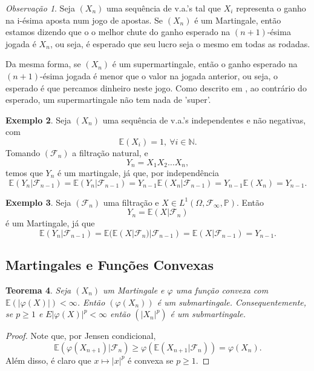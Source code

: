 \documentclass[12pt,a4paper,oneside]{book}
\newtheorem{theorem}{Teorema}[section]
\theoremstyle{definition}
\newtheorem{example}[theorem]{Exemplo}
\theoremstyle{remark}
\newtheorem{remark}[theorem]{Observa\c{c}\~ao}
\numberwithin{equation}{section}
\newcommand{\N}{\mathbb{N}}
\newcommand{\E}{\mathbb{E}}
\newcommand{\pr}{\mathbb{P}}
\newcommand{\F}{\mathcal{F}}
\begin{document}
\begin{tcolorbox}[colback= yellow!60]
\begin{remark}
Seja $(X_n)$ uma sequência de v.a.'s tal que $X_i$ representa o ganho na i-ésima aposta num jogo de apostas. Se $(X_n)$ é um Martingale, então estamos dizendo que o o melhor chute do ganho esperado na ${(n+1)}$-ésima jogada é $X_n$, ou seja, é esperado que seu lucro seja o mesmo em todas as rodadas.

Da mesma forma, se $(X_n)$ é um supermartingale, então o ganho esperado na ${(n+1)}$-ésima jogada é menor que o valor na jogada anterior, ou seja, o esperado é que percamos dinheiro neste jogo. Como descrito em \cite{durrett}, ao contrário do esperado, um supermartingale não tem nada de 'super'.
\end{remark}
\end{tcolorbox}







\begin{example}
Seja $(X_n)$ uma sequência de v.a.'s independentes e não negativas, com 
$$\E(X_i) = 1,\ \forall i\in \N. $$
Tomando $(\F_n)$ a filtração natural, e 
$$Y_n = X_1 X_2\dots X_n, $$
temos que $Y_n$ é um martingale, já que, por independência
$$\E(Y_n|\F_{n-1}) =  \E(Y_n|\F_{n-1})  = Y_{n-1}\E(X_n | \F_{n-1}) = Y_{n-1}\E(X_n) = Y_{n-1}. $$
\end{example}



\begin{example}
Seja $(\F_n)$ uma filtração e $X\in L^1(\Omega, \F_{\infty},\pr)$. Então 
$$Y_n = \E(X|\F_n)$$
é um Martingale, já que
$$\E(Y_n |\F_{n-1}) = \E(\E(X|\F_n)|\F_{n-1}) = \E(X|\F_{n-1}) = Y_{n-1}. $$ 
\end{example}














\subsection{Martingales e  Funções Convexas}

\begin{theorem}
Seja $(X_n)$ um Martingale e $\varphi$ uma função convexa com $\E(|\varphi(X)|)<\infty$. Então $(\varphi(X_n))$ é um submartingale. Consequentemente, se $p\geq 1$ e $E|\varphi(X)|^p<\infty$ então $(|X_n|^p)$ é um submartingale.
\end{theorem}
\begin{proof}
Note que, por Jensen condicional,
$$\E(\varphi(X_{n+1})|\F_n) \geq \varphi(\E(X_{n+1}|\F_n)) = \varphi(X_n).$$
Além disso, é claro que $x\mapsto |x|^p$ é convexa se $p\geq 1.$
\end{proof}
\end{document}
